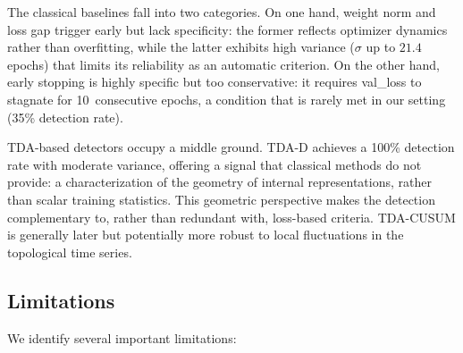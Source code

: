 \documentclass[11pt,a4paper]{article}
\begin{document}
The classical baselines fall into two categories. On one hand, weight norm and
loss gap trigger early but lack specificity: the former reflects optimizer
dynamics rather than overfitting, while the latter exhibits high variance
($\sigma$ up to $21.4$ epochs) that limits its reliability as an automatic
criterion. On the other hand, early stopping is highly specific but too
conservative: it requires val\_loss to stagnate for 10~consecutive epochs,
a condition that is rarely met in our setting (35\% detection rate).

TDA-based detectors occupy a middle ground. TDA-D achieves a 100\% detection
rate with moderate variance, offering a signal that classical methods do not
provide: a characterization of the geometry of internal representations,
rather than scalar training statistics. This geometric perspective makes the
detection complementary to, rather than redundant with, loss-based criteria.
TDA-CUSUM is generally later but potentially more robust to local fluctuations
in the topological time series.

\subsection{Limitations}
\label{subsec:limitations}

We identify several important limitations:
\end{document}
